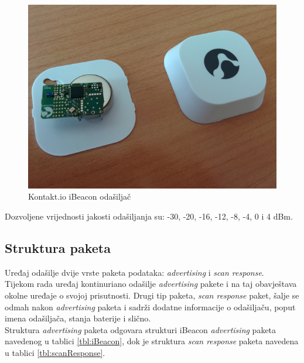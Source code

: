 \begin{figure}[H]
    \centering
    \includegraphics[scale=0.55]{pictures/ibeacon}
    \caption{Kontakt.io iBeacon odašiljač}
\end{figure}

Dozvoljene vrijednosti jakosti odašiljanja su: -30, -20, -16, -12, -8, -4, 0 i 4 dBm.


\subsection{Struktura paketa}

Uređaj odašilje dvije vrste paketa podataka: \textit{advertising} i \textit{scan response}.
\\
Tijekom rada uređaj kontinuriano odašilje \textit{advertising} pakete i na taj obavještava okolne uređaje o svojoj prisutnosti. 
Drugi tip paketa, \textit{scan response} paket, šalje se odmah nakon \textit{advertising} paketa i sadrži dodatne informacije o odašiljaču, poput imena odašiljača, stanja baterije i slično.
\\

Struktura \textit{advertising} paketa odgovara strukturi iBeacon \textit{advertising} paketa navedenog u tablici \ref{tbl:iBeacon}, dok je struktura \textit{scan response} paketa navedena u tablici \ref{tbl:scanResponse}.
\\

